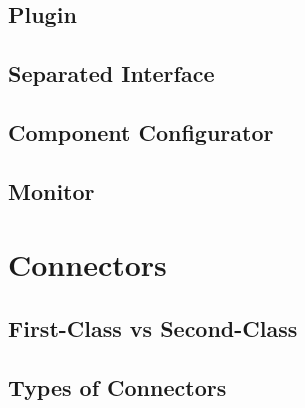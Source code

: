 
\subsection{Plugin}


\subsection{Separated Interface}


\subsection{Component Configurator}


\subsection{Monitor}


\section{Connectors}


\subsection{First-Class vs Second-Class}


\subsection{Types of Connectors}
